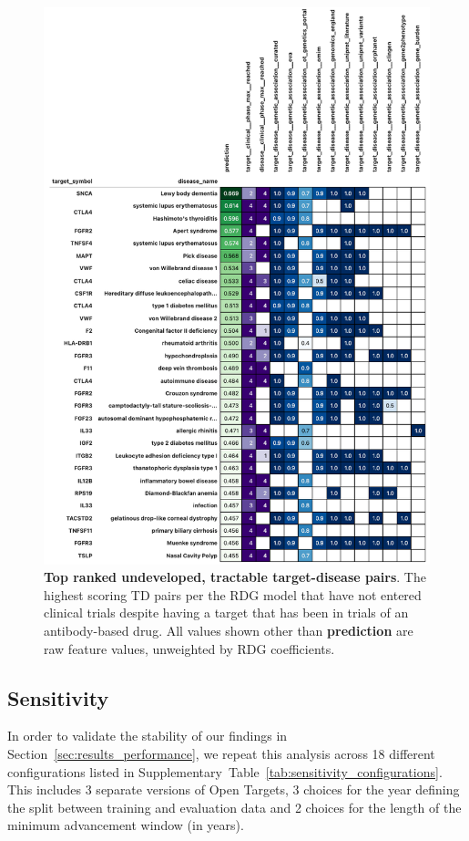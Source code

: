 \documentclass{article}
\begin{document}
\begin{figure}[H]
  \centering
  \captionsetup{width=.9\linewidth}
  \includegraphics[width=.9\textwidth]{top_opportunity_predictions.png}
  \caption{
    \textbf{Top ranked undeveloped, tractable target-disease pairs}. The highest scoring TD pairs per the RDG model that have not entered clinical trials despite having a target that has been in trials of an antibody-based drug. All values shown other than \textbf{prediction} are raw feature values, unweighted by RDG coefficients.
  }
  \label{fig:top_opportunity_predictions}
\end{figure}


\subsection{Sensitivity}

In order to validate the stability of our findings in Section~\ref{sec:results_performance}, we repeat this analysis across 18 different configurations listed in Supplementary~Table~\ref{tab:sensitivity_configurations}. This includes 3 separate versions of Open Targets, 3 choices for the year defining the split between training and evaluation data and 2 choices for the length of the minimum advancement window (in years).
\end{document}
